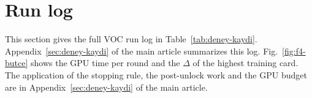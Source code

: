 \setcounter{table}{0}\setcounter{figure}{0}
\section{Run log}\label{sec:ek-dokum}

This section gives the full VOC run log in Table~\ref{tab:deney-kaydi}. Appendix~\ref{sec:deney-kaydi} of the main article summarizes this log. Fig.~\ref{fig:f4-butce} shows the GPU time per round and the $\Delta$ of the highest training card. The application of the stopping rule, the post-unlock work and the GPU budget are in Appendix~\ref{sec:deney-kaydi} of the main article.





\FloatBarrier

